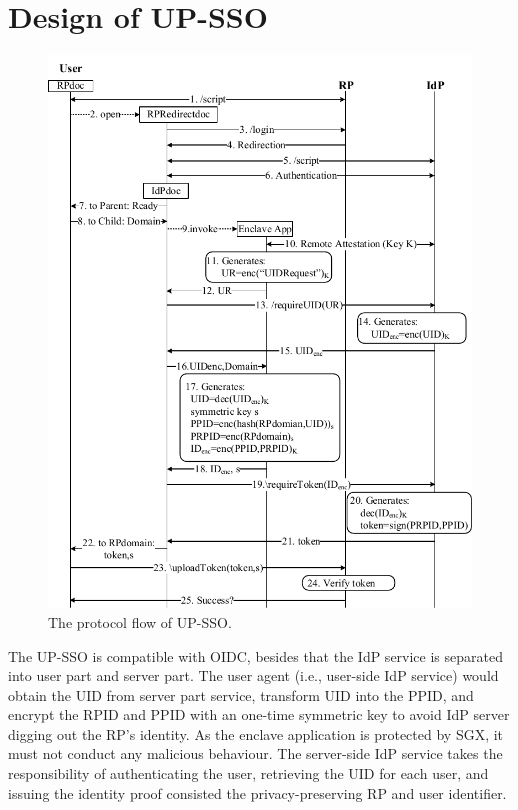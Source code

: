\section{Design of UP-SSO}
\label{sec:design}
\begin{figure}[t!]
  \centering
  \includegraphics[width=\linewidth]{fig/sgx-sso.pdf}
  \caption{The protocol flow of UP-SSO.}
  \label{fig:UP-SSO}
\end{figure}
The UP-SSO is compatible with OIDC, besides that the IdP service is separated into user part and server part. 
The user agent (i.e., user-side IdP service) would obtain the UID from server part service, transform UID into the PPID, and encrypt the RPID and PPID with an one-time symmetric key to avoid IdP server digging out the RP's identity. As the enclave application is protected by SGX, it must not conduct any malicious behaviour. 
The server-side IdP service takes the responsibility of authenticating the user, retrieving the UID for each user, and issuing the identity proof consisted the privacy-preserving RP and user identifier.


